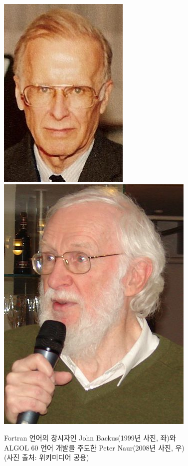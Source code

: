 \documentclass[b5paper,chapter,figtabcapt]{oblivoir}
\begin{document}
\begin{figure}\centering
\includegraphics[scale=0.25]{JohnBackus.jpg}
\qquad\qquad\qquad
\includegraphics[scale=0.21]{PeterNaur.jpg}
\caption{Fortran 언어의 창시자인 John Backus(1999년 사진, 좌)와\\
         ALGOL 60 언어 개발을 주도한 Peter Naur(2008년 사진, 우)\\
         {\scriptsize(사진 출처: 위키미디어 공용)}\label{fig:BackusNaur}}
\end{figure}
\end{document}
